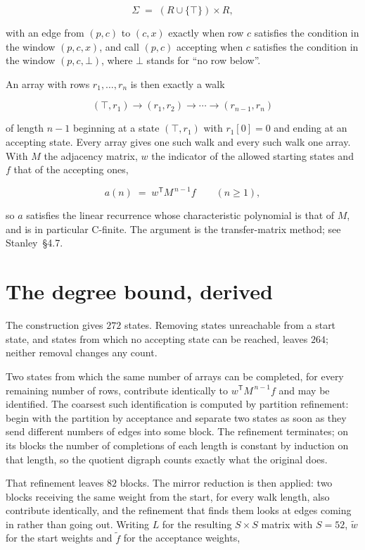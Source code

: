 \documentclass[11pt]{article}
\theoremstyle{definition}
\begin{document}
\[\Sigma \;=\; (R \cup \{\top\}) \times R,\]

with an edge from $(p,c)$ to $(c,x)$ exactly when row $c$ satisfies the condition in the window $(p,c,x)$, and call $(p,c)$ accepting when $c$ satisfies the condition in the window $(p,c,\bot)$, where $\bot$ stands for ``no row below''.

An array with rows $r_1,\dots,r_n$ is then exactly a walk

\[(\top,r_1) \to (r_1,r_2) \to \cdots \to (r_{n-1},r_n)\]

of length $n-1$ beginning at a state $(\top,r_1)$ with $r_1[0]=0$ and ending at an accepting state. Every array gives one such walk and every such walk one array. With $M$ the adjacency matrix, $w$ the indicator of the allowed starting states and $f$ that of the accepting ones,

\[a(n) \;=\; w^{\mathsf T} M^{\,n-1} f \qquad (n \ge 1),\]

so $a$ satisfies the linear recurrence whose characteristic polynomial is that of $M$, and is in particular C-finite. The argument is the transfer-matrix method; see Stanley~\S4.7.

\section{The degree bound, derived}

The construction gives $272$ states. Removing states unreachable from a start state, and states from which no accepting state can be reached, leaves $264$; neither removal changes any count.

Two states from which the same number of arrays can be completed, for every remaining number of rows, contribute identically to $w^{\mathsf T}M^{\,n-1}f$ and may be identified. The coarsest such identification is computed by partition refinement: begin with the partition by acceptance and separate two states as soon as they send different numbers of edges into some block. The refinement terminates; on its blocks the number of completions of each length is constant by induction on that length, so the quotient digraph counts exactly what the original does.

That refinement leaves $82$ blocks. The mirror reduction is then applied: two blocks receiving the same weight from the start, for every walk length, also contribute identically, and the refinement that finds them looks at edges coming in rather than going out. Writing $L$ for the resulting $S \times S$ matrix with $S = 52$, $\tilde w$ for the start weights and $\tilde f$ for the acceptance weights,
\end{document}
